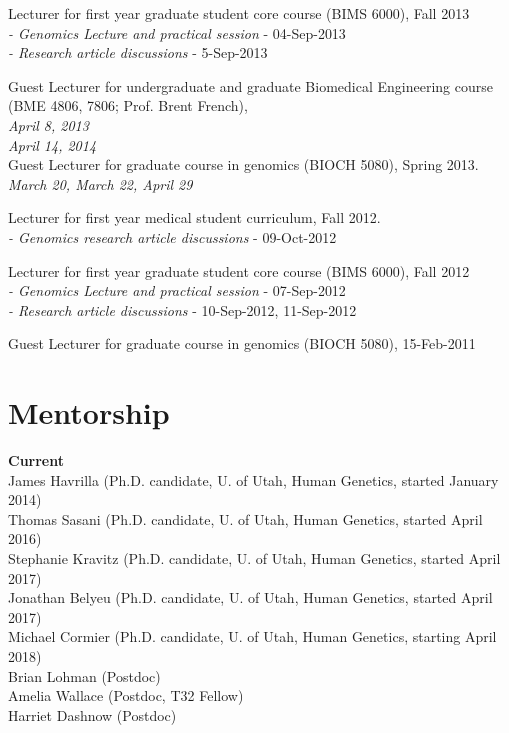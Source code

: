 \documentclass[margin,line]{cv}
\begin{document}
\begin{resume}
    \vspace{-2mm}
    Lecturer for first year graduate student core course (BIMS 6000), Fall 2013 \\
    \emph{- Genomics Lecture and practical session} - 04-Sep-2013 \\
    \emph{- Research article discussions} - 5-Sep-2013

    \vspace{-2mm}
    Guest Lecturer for undergraduate and graduate Biomedical Engineering course (BME 4806, 7806; Prof. Brent French), \\
    \emph{April 8, 2013} \\
    \emph{April 14, 2014} \\


    Guest Lecturer for graduate course in genomics (BIOCH 5080), Spring 2013. \\
	\emph{March 20, March 22, April 29}

    Lecturer for first year medical student curriculum, Fall 2012. \\
	\emph{- Genomics research article discussions} - 09-Oct-2012

    \vspace{-2mm}
    Lecturer for first year graduate student core course (BIMS 6000), Fall 2012 \\
	\emph{- Genomics Lecture and practical session} - 07-Sep-2012 \\
	\emph{- Research article discussions} - 10-Sep-2012, 11-Sep-2012

    \vspace{-2mm}
    Guest Lecturer for graduate course in genomics (BIOCH 5080), 15-Feb-2011



    \section{\mysidestyle Mentorship}
    \textbf{Current} \\
    James Havrilla (Ph.D. candidate, U. of Utah, Human Genetics, started January 2014) \\
    Thomas Sasani (Ph.D. candidate, U. of Utah, Human Genetics, started April 2016) \\
    Stephanie Kravitz (Ph.D. candidate, U. of Utah, Human Genetics, started April 2017) \\
    Jonathan Belyeu (Ph.D. candidate, U. of Utah, Human Genetics, started April 2017) \\
    Michael Cormier (Ph.D. candidate, U. of Utah, Human Genetics, starting April 2018) \\
    Brian Lohman (Postdoc) \\
    Amelia Wallace (Postdoc, T32 Fellow) \\
    Harriet Dashnow (Postdoc) \\



\end{resume}
\end{document}
